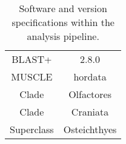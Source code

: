 \begin{table}
\caption{Software and version specifications within the analysis pipeline.}
\centering 
    \begin{tabular}{| c | c |}
    \hline
        BLAST+ & 2.8.0 \\
        MUSCLE & hordata \\ 
        Clade & Olfactores \\ 
        Clade & Craniata \\ 
        Superclass &  Osteichthyes\\ 
    \hline
    \end{tabular}
\end{table}
